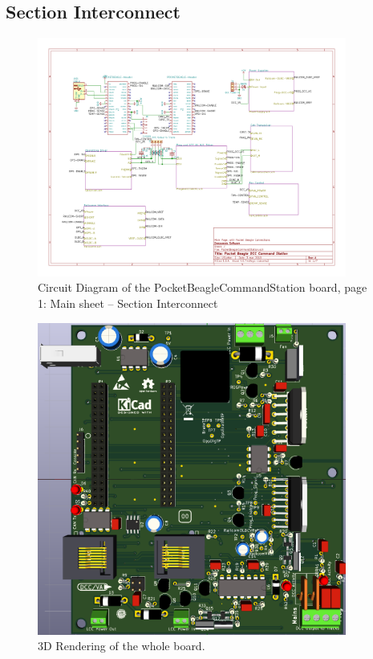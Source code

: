 \subsection{Section Interconnect}
\begin{figure}[hbpt]\begin{centering}%
\includegraphics[width=4in]{PocketBeagleCommandStation-1.pdf}
\caption{Circuit Diagram of the PocketBeagleCommandStation board, page 1: Main 
sheet -- Section Interconnect}
\end{centering}\end{figure}
\begin{figure}[hbpt]\begin{centering}%
\includegraphics[width=4in]{PocketBeagleCommandStation.png}
\caption{3D Rendering of the whole board.}
\end{centering}\end{figure}

